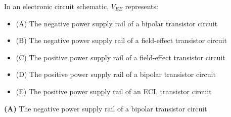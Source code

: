 

In an electronic circuit schematic, $V_{EE}$ represents:

\begin{itemize}
\item{(A)} The negative power supply rail of a bipolar transistor circuit
\vskip 5pt 
\item{(B)} The negative power supply rail of a field-effect transistor circuit
\vskip 5pt 
\item{(C)} The positive power supply rail of a field-effect transistor circuit
\vskip 5pt 
\item{(D)} The positive power supply rail of a bipolar transistor circuit
\vskip 5pt 
\item{(E)} The positive power supply rail of an ECL transistor circuit
\end{itemize}







{\bf (A)} The negative power supply rail of a bipolar transistor circuit
 










